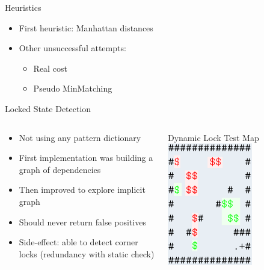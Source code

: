 \documentclass{beamer}
\begin{document}
\begin{frame}{Heuristics}
  \begin{itemize}
    \item First heuristic: Manhattan distances
    \item Other unsuccessful attempts:
    \begin{itemize}
      \item Real cost
      \item Pseudo MinMatching
    \end{itemize}
  \end{itemize}
\end{frame}


\begin{frame}{Locked State Detection}
  \begin{columns}
    \begin{column}{.5\textwidth}
      \begin{itemize}
        \item Not using any pattern dictionary
        \item First implementation was building a graph of dependencies
        \item Then improved to explore implicit graph
        \item Should never return false positives
        \item Side-effect: able to detect corner locks (redundancy with static check)
      \end{itemize}
    \end{column}
    \begin{column}{.5\textwidth}
      \begin{block}{Dynamic Lock Test Map}
        \centering
        \includegraphics[width=0.6\textwidth]{dynamic.png}
      \end{block}
    \end{column}
  \end{columns}

\end{frame}
\end{document}
